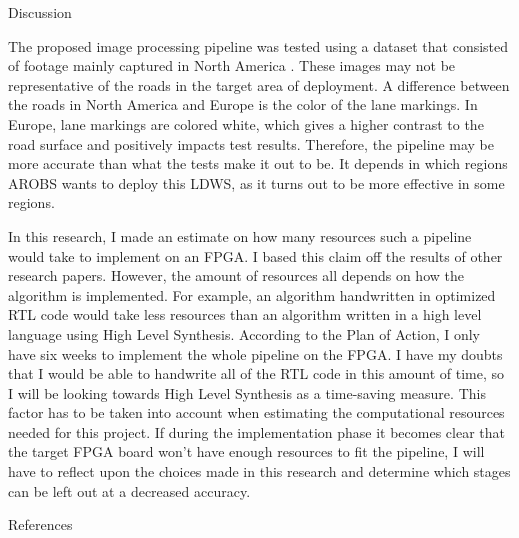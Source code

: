 \documentclass{matthijs}
\begin{document}
	\begin{hoofdstuk}{Discussion}

		The proposed image processing pipeline was tested using a dataset that consisted of footage mainly captured in North America \cite{yu2020bdd100k}.
		These images may not be representative of the roads in the target area of deployment.
		A difference between the roads in North America and Europe is the color of the lane markings.
		In Europe, lane markings are colored white, which gives a higher contrast to the road surface and positively impacts test results.
		Therefore, the pipeline may be more accurate than what the tests make it out to be.
		It depends in which regions AROBS wants to deploy this LDWS, as it turns out to be more effective in some regions.

		\bigskip

		In this research, I made an estimate on how many resources such a pipeline would take to implement on an FPGA.
		I based this claim off the results of other research papers.
		However, the amount of resources all depends on how the algorithm is implemented.
		For example, an algorithm handwritten in optimized RTL code would take less resources than an algorithm written in a high level language using High Level Synthesis.
		According to the Plan of Action, I only have six weeks to implement the whole pipeline on the FPGA.
		I have my doubts that I would be able to handwrite all of the RTL code in this amount of time, so I will be looking towards High Level Synthesis as a time-saving measure.
		This factor has to be taken into account when estimating the computational resources needed for this project.
		If during the implementation phase it becomes clear that the target FPGA board won't have enough resources to fit the pipeline, I will have to reflect upon the choices made in this research and determine which stages can be left out at a decreased accuracy.

	\end{hoofdstuk}

	\begin{hoofdstuk}{References}

		\printbibliography[heading=none]
	
	\end{hoofdstuk}

	\makelastpage
\end{document}
